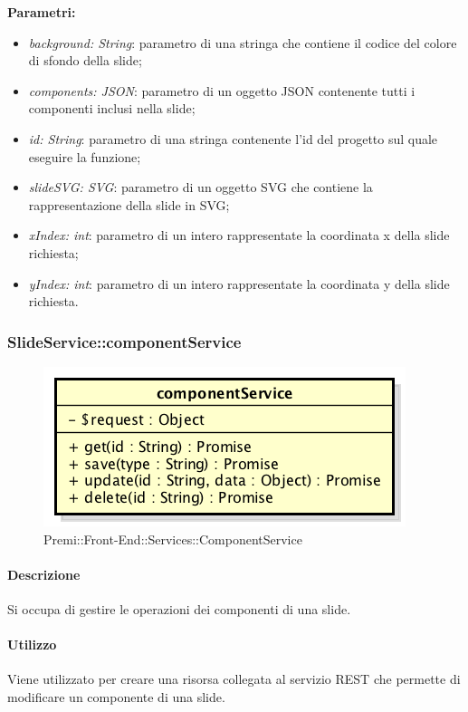 \begin{itemize}
			\textbf{Parametri:}\\
			\begin{itemize}
				\item \textit{background: String}: parametro di una stringa che contiene il codice del colore di sfondo della \gls{slide};
				\item \textit{components: JSON}: parametro di un oggetto \gls{JSON} contenente tutti i componenti inclusi nella \gls{slide};
				\item \textit{id: String}: parametro di una stringa contenente l'id del progetto sul quale eseguire la funzione;
				\item \textit{slideSVG: SVG}: parametro di un oggetto SVG che contiene la rappresentazione della \gls{slide} in SVG;
				\item \textit{xIndex: int}: parametro di un intero rappresentate la coordinata x della \gls{slide} richiesta;
				\item \textit{yIndex: int}: parametro di un intero rappresentate la coordinata y della \gls{slide} richiesta.
			\end{itemize}
		\end{itemize}
\newpage		
		
\subsubsection{SlideService::componentService}
	\begin{figure}[h]
		\centering
		\includegraphics[width=0.5\linewidth]{img/premi_front_end_services_componentservice}
		\caption[Premi::Front-End::Services::ComponentService]{Premi::Front-End::Services::ComponentService}
	\end{figure}
	
	\paragraph{Descrizione}
	Si occupa di gestire le operazioni dei componenti di una \gls{slide}.
	
	\paragraph{Utilizzo}
	Viene utilizzato per creare una risorsa collegata al servizio \gls{REST} che permette di modificare un componente di una \gls{slide}.
	
